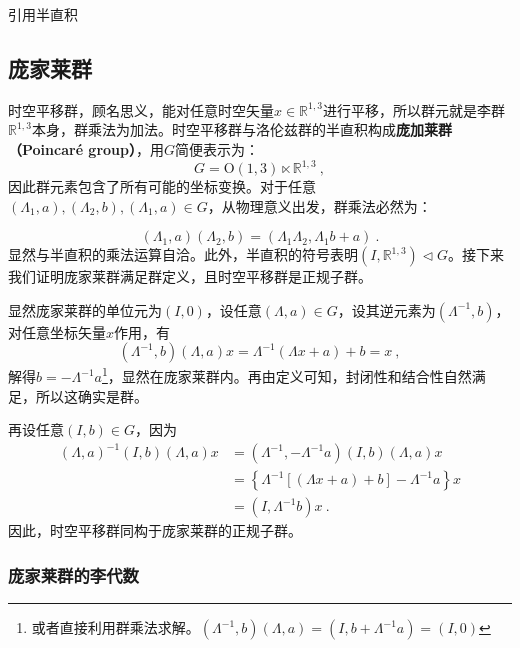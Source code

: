 

\begin{issues}
\issueTODO 引用半直积
\end{issues}


\subsection{庞家莱群}
时空平移群，顾名思义，能对任意时空矢量$x\in \mathbb R^{1,3} $进行平移，所以群元就是李群$\mathbb R^{1,3}$本身，群乘法为加法。时空平移群与洛伦兹群的半直积构成\textbf{庞加莱群（Poincaré group）}，用$G$简便表示为：
\begin{equation}
G= \mathrm{O}(1,3) \ltimes\mathbb{R}^{1,3}~,
\end{equation}
因此群元素包含了所有可能的坐标变换。对于任意$(\Lambda_1,a),(\Lambda_2,b),(\Lambda_1,a)\in G$，从物理意义出发，群乘法必然为：

\begin{equation}
(\Lambda_1,a)(\Lambda_2,b)=(\Lambda_1\Lambda_2,\Lambda_1b+a)~.
\end{equation}
显然与半直积的乘法运算自洽。此外，半直积的符号表明$(I,\mathbb R^{1,3})\vartriangleleft G$。接下来我们证明庞家莱群满足群定义，且时空平移群是正规子群。

显然庞家莱群的单位元为$(I,0)$，设任意$(\Lambda,a)\in G$，设其逆元素为$(\Lambda^{-1},b)$，对任意坐标矢量$x$作用，有
\begin{equation}
(\Lambda^{-1},b)(\Lambda,a)x=\Lambda^{-1}(\Lambda x+a)+b=x~,
\end{equation}
解得$b=-\Lambda^{-1} a$\footnote{或者直接利用群乘法求解。$(\Lambda^{-1},b)(\Lambda,a)=(I,b+\Lambda^{-1}a)=(I,0)$}，显然在庞家莱群内。再由定义可知，封闭性和结合性自然满足，所以这确实是群。

再设任意$(I,b)\in G$，因为
\begin{equation}
\begin{aligned}
(\Lambda,a)^{-1}(I,b)(\Lambda,a)x&=(\Lambda^{-1},-\Lambda^{-1}a)(I,b)(\Lambda,a)x\\
&=\left\{\Lambda^{-1}\left [\left(\Lambda x+a \right)+b\right]-\Lambda^{-1}a\right\}x\\
&=(I,\Lambda^{-1}b)x~.
\end{aligned}
\end{equation}
因此，时空平移群同构于庞家莱群的正规子群。



\subsubsection{庞家莱群的李代数}
